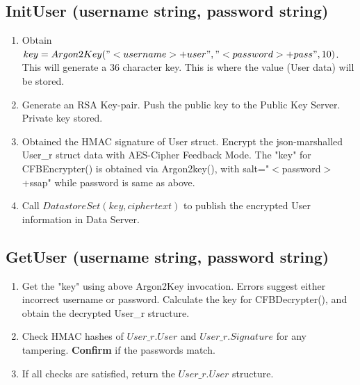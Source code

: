 \documentclass[a4paper, 12pt]{scrartcl}
\begin{document}
\subsection{InitUser (username string, password string)}
\begin{enumerate}
	\itemsep0em

	\item Obtain $key = Argon2Key("<username>+user", "<password>+pass", 10)$. This will generate a 36 character key. This is where the value (User data) will be stored.
	\item Generate an RSA Key-pair. Push the public key to the Public Key Server. Private key stored.
	\item Obtained the HMAC signature of User struct. Encrypt the json-marshalled User\_r struct data with AES-Cipher Feedback Mode. The "key" for CFBEncrypter() is obtained via Argon2key(), with salt="$<$password$>$+ssap" while password is same as above.
	\item Call $DatastoreSet(key, ciphertext)$ to publish the encrypted User information in Data Server.
\end{enumerate}

\subsection{GetUser (username string, password string)}
\begin{enumerate}
	\itemsep0em

	\item Get the "key" using above Argon2Key invocation. Errors suggest either incorrect username or password. Calculate the key for CFBDecrypter(), and obtain the decrypted User\_r structure.
	\item Check HMAC hashes of $User\_r.User$ and $User\_r.Signature$ for any tampering. \textbf{Confirm} if the passwords match. 
	\item If all checks are satisfied, return the $User\_r.User$ structure.
\end{enumerate}
\end{document}
